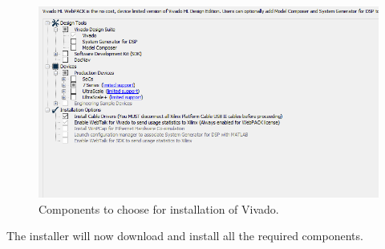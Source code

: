 \documentclass{article}
\begin{document}
\begin{figure}[h] \centering 
  \includegraphics[width=\linewidth]{./images/install_options.png}
  \caption{Components to choose for installation of Vivado.}
  \label{Fig:install_options}
\end{figure}
The installer will now download and install all the required components.
\end{document}
